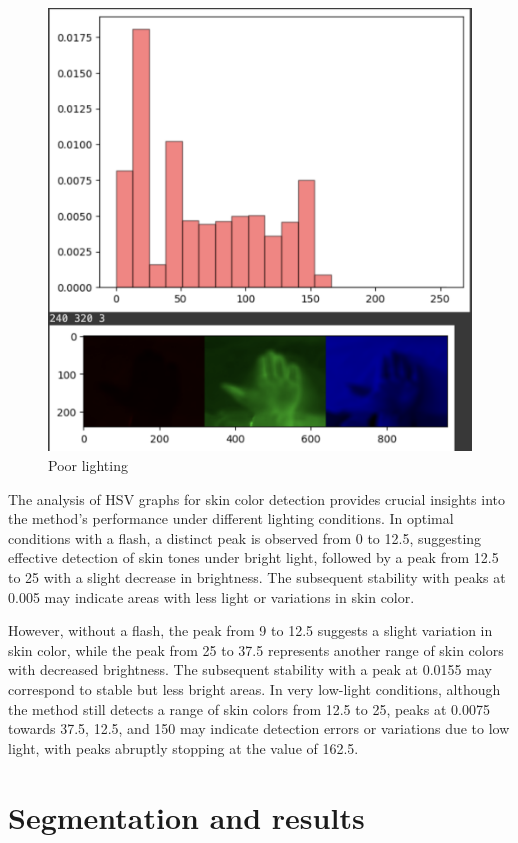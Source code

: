 \documentclass{report}
\begin{document}
\begin{figure}[H]
\includegraphics[scale=0.4]{Images/HSVDown_J.png}
 \caption{Poor lighting}
\centering
\end{figure}
The analysis of HSV graphs for skin color detection provides crucial insights into the method's performance under different lighting conditions. In optimal conditions with a flash, a distinct peak is observed from 0 to 12.5, suggesting effective detection of skin tones under bright light, followed by a peak from 12.5 to 25 with a slight decrease in brightness. The subsequent stability with peaks at 0.005 may indicate areas with less light or variations in skin color.

However, without a flash, the peak from 9 to 12.5 suggests a slight variation in skin color, while the peak from 25 to 37.5 represents another range of skin colors with decreased brightness. The subsequent stability with a peak at 0.0155 may correspond to stable but less bright areas. In very low-light conditions, although the method still detects a range of skin colors from 12.5 to 25, peaks at 0.0075 towards 37.5, 12.5, and 150 may indicate detection errors or variations due to low light, with peaks abruptly stopping at the value of 162.5.
\chapter{Segmentation and results}
\end{document}
